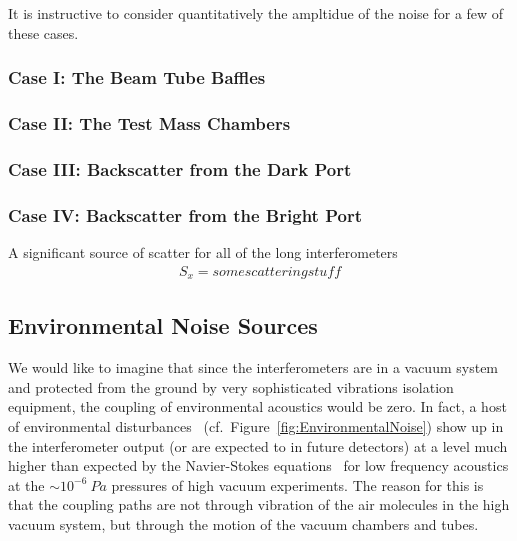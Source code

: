 It is instructive to consider quantitatively the ampltidue of the noise for a few of
these cases.
\subsubsection{Case I: The Beam Tube Baffles}


\subsubsection{Case II: The Test Mass Chambers}


\subsubsection{Case III: Backscatter from the Dark Port}


\subsubsection{Case IV: Backscatter from the Bright Port}
A significant source of scatter for all of the long interferometers
\begin{align}
S_x = some scattering stuff
\end{align}

\subsection{Environmental Noise Sources}
We would like to imagine that since the interferometers are in a vacuum system and
protected from the ground by very sophisticated vibrations isolation equipment,
the coupling of environmental acoustics would be zero. In fact, a host of environmental
disturbances~\cite{Effler:2015hw, Acernese:2006dq} (cf.~Figure~\ref{fig:EnvironmentalNoise}) show up in the interferometer
output (or are expected to in future detectors) at a level much higher than
expected by the Navier-Stokes equations~\cite{Greenspan:sound} for low frequency
acoustics at the $\sim10^{-6}~Pa$ pressures of high vacuum experiments. The reason
for this is that the coupling paths are not through vibration of the air molecules
in the high vacuum system, but through the motion of the vacuum chambers and tubes.




